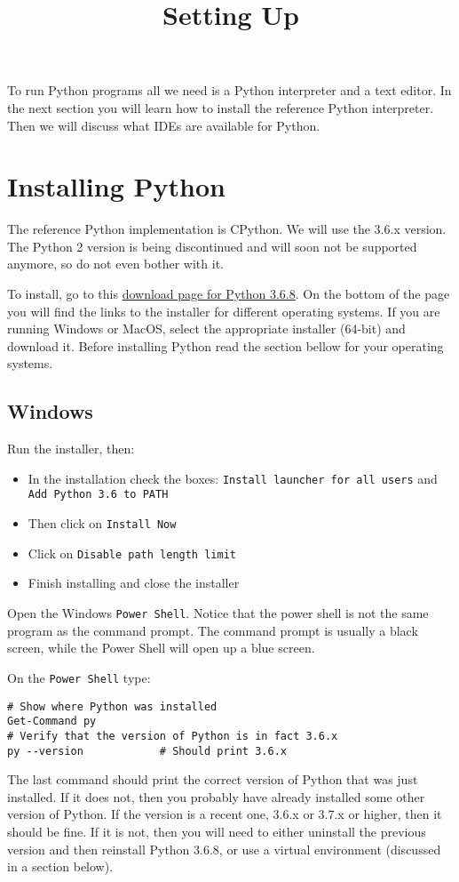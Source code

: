 \documentclass[12pt, a4paper]{article}
\date{}
\title{Setting Up}
\begin{document}
\maketitle
To run Python programs all we need is a Python interpreter and a text editor.
In the next section you will learn how to install the reference Python interpreter.
Then we will discuss what IDEs are available for Python.
\section*{Installing Python}
\label{sec:org150c9c9}
The reference Python implementation is CPython.
We will use the 3.6.x version.
The Python 2 version is being discontinued and will soon not be supported anymore, so do not even bother with it.

To install, go to this \href{https://www.python.org/downloads/release/python-368/}{download page for Python 3.6.8}.
On the bottom of the page you will find the links to the installer for different operating systems.
If you are running Windows or MacOS, select the appropriate installer (64-bit) and download it.
Before installing Python read the section bellow for your operating systems.
\subsection*{Windows}
\label{sec:org6d81aa9}
Run the installer, then:
\begin{itemize}
\item In the installation check the boxes: \texttt{Install launcher for all users} and \texttt{Add Python 3.6 to PATH}
\item Then click on \texttt{Install Now}
\item Click on \texttt{Disable path length limit}
\item Finish installing and close the installer
\end{itemize}

Open the Windows \texttt{Power Shell}.
Notice that the power shell is not the same program as the command prompt.
The command prompt is usually a black screen, while the Power Shell will open up a blue screen.

On the \texttt{Power Shell} type:
\lstset{language=bash,label= ,caption= ,captionpos=b,firstnumber=1,numbers=left,style=powershell}
\begin{lstlisting}
# Show where Python was installed
Get-Command py
# Verify that the version of Python is in fact 3.6.x
py --version			# Should print 3.6.x
\end{lstlisting}
The last command should print the correct version of Python that was just installed.
If it does not, then you probably have already installed some other version of Python.
If the version is a recent one, 3.6.x or 3.7.x or higher, then it should be fine.
If it is not, then you will need to either uninstall the previous version and then reinstall Python 3.6.8, or use a virtual environment (discussed in a section below).
\end{document}
